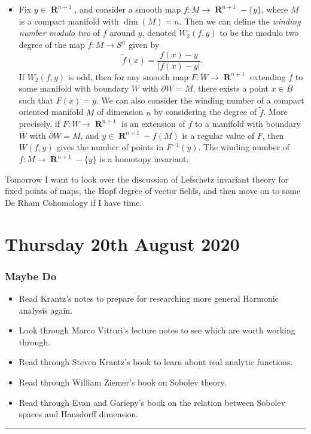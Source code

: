 \documentclass[openany,nobib,nols,a4paper,twoside,symmetric,justified,notoc]{tufte-book}
\theoremstyle{plain}
\theoremstyle{remark}
\theoremstyle{definition}
\newenvironment{maybedo}%
    {\subsection{Maybe Do}}%
    {\vspace{2mm}\hrule\hspace{\stretch{1}}\\}
\DeclareMathOperator{\RR}{\mathbf{R}}
\begin{document}
\begin{itemize}
    \item Fix $y \in \RR^{n+1}$, and consider a smooth map $f: M \to \RR^{n+1} - \{ y \}$, where $M$ is a compact manifold with $\dim(M) = n$. Then we can define the \emph{winding number modulo two} of $f$ around $y$, denoted $W_2(f,y)$ to be the modulo two degree of the map $\tilde{f}: M \to S^n$ given by
    \[ \tilde{f}(x) = \frac{f(x) - y}{|f(x) - y|}. \]
    If $W_2(f,y)$ is odd, then for any smooth map $F: W \to \RR^{n+1}$ extending $f$ to some manifold with boundary $W$ with $\partial W = M$, there exists a point $x \in B$ such that $F(x) = y$. We can also consider the winding number of a compact oriented manifold $M$ of dimension $n$ by considering the degree of $\tilde{f}$. More precisely, if $F: W \to \RR^{n+1}$ is an extension of $f$ to a manifold with boundary $W$ with $\partial W = M$, and $y \in \RR^{n+1} - f(M)$ is a regular value of $F$, then $W(f,y)$ gives the number of points in $F^{-1}(y)$. The winding number of $f: M \to \RR^{n+1} - \{ y \}$ is a homotopy invariant.
\end{itemize}

Tomorrow I want to look over the discussion of Lefschetz invariant theory for fixed points of maps, the Hopf degree of vector fields, and then move on to some De Rham Cohomology if I have time.








\chapter{Thursday 20th August 2020} \label{04062020}

\begin{maybedo}
    \begin{itemize}
        \item Read Krantz's notes \cite{Krantz2007} to prepare for researching more general Harmonic analysis again.

        \item Look through Marco Vitturi's lecture notes to see which are worth working through.

        \item Read through Steven Krantz's book \cite{Krantz2002} to learn about real analytic functions.

        \item Read through William Ziemer's book \cite{Ziemer1989} on Sobolev theory.

        \item Read through Evan and Gariepy's book \cite{Evans1992} on the relation between Sobolev spaces and Hausdorff dimension.
    \end{itemize}
\end{maybedo}
\end{document}
